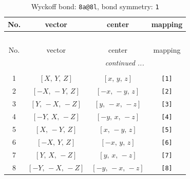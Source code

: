 \documentclass[fleqn,8pt]{jsarticle}
\begin{document}
\begin{longtable}{cccc}
\caption{Wyckoff bond: {\tt 8a@8l}, bond symmetry: {\tt 1}}
 \\
 \hline \hline
No. & vector & center & mapping \\ \hline \endfirsthead

\multicolumn{3}{l}{\tablename\ \thetable{}} \\
 \hline \hline
No. & vector & center & mapping \\ \hline \endhead

 \hline \hline
\multicolumn{3}{r}{\footnotesize\it continued ...} \\ \endfoot

 \hline \hline
\multicolumn{3}{r}{} \\ \endlastfoot

1 & $\left[ X,\, Y,\, Z \right]$ & $\left[ x,\, y,\, z \right]$ & {\tt [1]} \\ \hline
2 & $\left[ - X,\, - Y,\, Z \right]$ & $\left[ - x,\, - y,\, z \right]$ & {\tt [2]} \\ \hline
3 & $\left[ Y,\, - X,\, - Z \right]$ & $\left[ y,\, - x,\, - z \right]$ & {\tt [3]} \\ \hline
4 & $\left[ - Y,\, X,\, - Z \right]$ & $\left[ - y,\, x,\, - z \right]$ & {\tt [4]} \\ \hline
5 & $\left[ X,\, - Y,\, Z \right]$ & $\left[ x,\, - y,\, z \right]$ & {\tt [5]} \\ \hline
6 & $\left[ - X,\, Y,\, Z \right]$ & $\left[ - x,\, y,\, z \right]$ & {\tt [6]} \\ \hline
7 & $\left[ Y,\, X,\, - Z \right]$ & $\left[ y,\, x,\, - z \right]$ & {\tt [7]} \\ \hline
8 & $\left[ - Y,\, - X,\, - Z \right]$ & $\left[ - y,\, - x,\, - z \right]$ & {\tt [8]} \\
\end{longtable}
\end{document}
